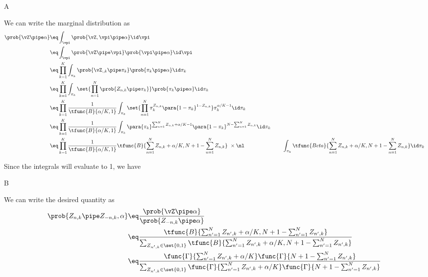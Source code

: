 \documentclass{article}
\begin{document}
\begin{question}

	\begin{qpart}{A}

		We can write the marginal distribution as
		\begin{align*}
			\prob{\vZ \pipe \alpha} &\eq \int_{\vpi} \prob{\vZ, \vpi \pipe \alpha} \id \vpi \\
			&\eq	\int_{\vpi} \prob{\vZ \pipe \vpi} \prob{\vpi \pipe \alpha} \id \vpi \\
			&\eq	\prod_{k = 1}^K \int_{\pi_k} \prob{\vZ_{:, k} \pipe \pi_k} \prob{\pi_k \pipe \alpha} \id \pi_k \\
			&\eq	\prod_{k = 1}^K \int_{\pi_k} \set{\prod_{n = 1}^N \prob{Z_{n, k} \pipe \pi_k}} \prob{\pi_k \pipe \alpha} \id \pi_k \\
			&\eq	\prod_{k = 1}^K \frac{1}{\tfunc{B}{\alpha / K, 1}} \int_{\pi_k} \set{\prod_{n = 1}^N \pi_k^{Z_{n, k}} \para{1 - \pi_k}^{1 - Z_{n, k}}} \pi_k^{\alpha / K - 1} \id \pi_k \\
			&\eq	\prod_{k = 1}^K \frac{1}{\tfunc{B}{\alpha / K, 1}} \int_{\pi_k} \para{\pi_k}^{\sum_{n = 1}^N Z_{n, k} + \alpha / K - 1} \para{1 - \pi_k}^{N - \sum_{n = 1}^N Z_{n, k}} \id \pi_k \\
			&\eq	\prod_{k = 1}^K \frac{1}{\tfunc{B}{\alpha / K, 1}} \tfunc{B}{\sum_{n = 1}^N Z_{n, k} + \alpha / K, N + 1 - \sum_{n = 1}^N Z_{n, k}}\ \times \nl \hspace{2.5cm} \int_{\pi_k} \tfunc{Beta}{\sum_{n = 1}^N Z_{n, k} + \alpha / K, N + 1 - \sum_{n = 1}^N Z_{n, k}} \id \pi_k \\
		\end{align*}

		Since the integrals will evaluate to 1, we have

	\end{qpart}

	\begin{qpart}{B}

		We can write the desired quantity as
		\begin{align*}
			\prob{Z_{n, k} \pipe Z_{- n, k}, \alpha} &\eq \frac{\prob{\vZ \pipe \alpha}}{\prob{Z_{- n, k} \pipe \alpha}} \\
			&\eq	\frac{\tfunc{B}{\sum_{n' = 1}^N Z_{n', k} + \alpha / K, N + 1 - \sum_{n' = 1}^N Z_{n', k}}}{\sum_{Z_{n', k} \in \set{0, 1}} \tfunc{B}{\sum_{n' = 1}^N Z_{n', k} + \alpha / K, N + 1 - \sum_{n' = 1}^N Z_{n', k}}} \\
			&\eq	\frac{\func{\Gamma}{\sum_{n' = 1}^N Z_{n', k} + \alpha / K} \func{\Gamma}{N + 1 - \sum_{n' = 1}^N Z_{n', k}}}{\sum_{Z_{n', k} \in \set{0, 1}} \func{\Gamma}{\sum_{n' = 1}^N Z_{n', k} + \alpha / K} \func{\Gamma}{N + 1 - \sum_{n' = 1}^N Z_{n', k}}} \\
		\end{align*}


\end{qpart}
\end{question}
\end{document}
